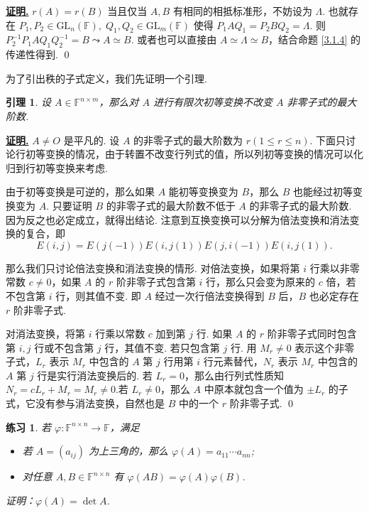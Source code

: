 \documentclass[10pt,openany]{article}
\theoremstyle{thmstyle} %
\newtheorem{practice}{练习}[section]
\theoremstyle{defstyle} %
\newtheorem{lemma}[theorem]{引理}
\theoremstyle{prostyle} %
\theoremstyle{exastyle}
\theoremstyle{remstyle}
\renewenvironment{proof}[1][证明]{\par\underline{\textbf{#1.}} \;\fangsong}{\qed\par}
\newcommand{\F}{\mathbb{F}}
\newcommand{\gfn}{\text{GL}_n(\mathbb{F})}
\newcommand{\gfm}{\text{GL}_m(\mathbb{F})}
\newcommand{\nm}{^{n \times m}}
\begin{document}
\begin{proof}
	\( r(A)=r(B) \) 当且仅当 \( A,B \) 有相同的相抵标准形，不妨设为 \( \Lambda \). 也就存在 \( P_1,P_2 \in \gfn, \; Q_1,Q_2 \in \gfm \) 使得 \( P_1AQ_1=P_2BQ_2=\Lambda \). 则 \( P_2^{-1}P_1AQ_1Q_2^{-1}=B \leadsto A \simeq B \). 或者也可以直接由 \( A \simeq \Lambda \simeq B \)，结合命题 \ref{3.1.4} 的传递性得到.
\end{proof}


为了引出秩的子式定义，我们先证明一个引理.

\begin{lemma} \label{3.1.8}
	设 \( A \in \F\nm \)，那么对 \( A \) 进行有限次初等变换不改变 \( A \) 非零子式的最大阶数.
\end{lemma}

\begin{proof}
	 \( A \neq O \) 是平凡的. 设 \( A \) 的非零子式的最大阶数为 \( r (1 \leq r \leq n) \). 下面只讨论行初等变换的情况，由于转置不改变行列式的值，所以列初等变换的情况可以化归到行初等变换来考虑. 
	 
	 由于初等变换是可逆的，那么如果 \( A \) 能初等变换变为 \( B \)，那么 \( B \) 也能经过初等变换变为 \( A \). 只要证明 \( B \) 的非零子式的最大阶数不低于 \( A \) 的非零子式的最大阶数. 因为反之也必定成立，就得出结论. 注意到互换变换可以分解为倍法变换和消法变换的复合，即
	 \[ E(i,j)=E(j(-1))E(i,j(1))E(j,i(-1))E(i,j(1)). \]
	 
	 那么我们只讨论倍法变换和消法变换的情形. 对倍法变换，如果将第 \( i \) 行乘以非零常数 \( c \neq 0 \)，如果 \( A \) 的 \( r \) 阶非零子式包含第 \( i \) 行，那么只会变为原来的 \( c \) 倍，若不包含第 \( i \) 行，则其值不变. 即 \( A \) 经过一次行倍法变换得到 \( B \) 后，\( B \) 也必定存在 \( r \) 阶非零子式.
	 
	 对消法变换，将第 \( i \) 行乘以常数 \( c \) 加到第 \( j \) 行. 如果 \( A \) 的 \( r \) 阶非零子式同时包含第 \( i,j \) 行或不包含第 \( j \) 行，其值不变. 若只包含第 \( j \) 行. 用 \( M_r \neq 0  \) 表示这个非零子式，\( L_r \) 表示 \( M_r \) 中包含的 \( A \) 第 \( j \) 行用第 \( i \) 行元素替代，\( N_r \) 表示 \( M_r \) 中包含的 \( A \) 第 \( j \) 行是实行消法变换后的. 若 \( L_r=0 \)，那么由行列式性质知 \( N_r=cL_r+M_r=M_r \neq 0 \).若 \( L_r \neq 0 \)，那么 \( A \) 中原本就包含一个值为 \( \pm L_r \) 的子式，它没有参与消法变换，自然也是 \( B \) 中的一个 \( r \) 阶非零子式.
\end{proof}

\begin{practice}
	若 \( \varphi: \mathbb{F}^{n \times n} \to \mathbb{F} \)，满足
	\begin{itemize}
		\item 若 \( A=(a_{ij}) \) 为上三角的，那么 \( \varphi(A)=a_{11}\cdots a_{nn} \);
		\item 对任意 \( A,B \in \mathbb{F}^{n \times n} \) 有 \( \varphi(AB)=\varphi(A) \varphi(B) \).
	\end{itemize}
	
	证明：\( \varphi(A)=\det A \).
\end{practice}
\end{document}
